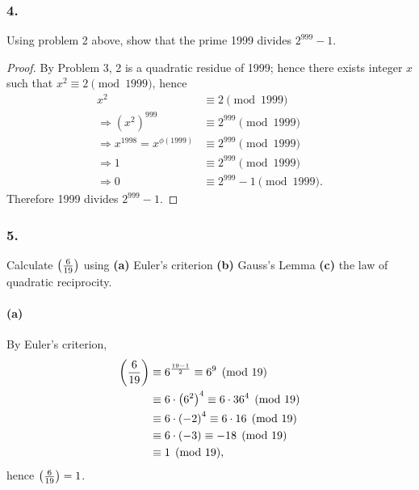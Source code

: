 \subsubsection{4.} Using problem 2 above, show that the prime 1999
divides $2^{999}-1$.

\begin{proof}
    By Problem 3, 2 is a quadratic residue of 1999; hence there exists integer $x$
    such that $x^2 \equiv 2 \pmod{1999}$, hence
    \begin{align*}
        x^2 &\equiv 2 \pmod{1999} \\
        \Rightarrow \left(x^2\right)^{999} &\equiv 2^{999} \pmod{1999} \\
        \Rightarrow x^{1998} = x^{\phi\left(1999\right)} &\equiv 2^{999} \pmod{1999} \\
        \Rightarrow 1 &\equiv 2^{999} \pmod{1999} \\
        \Rightarrow 0 &\equiv 2^{999}-1 \pmod{1999}.
    \end{align*}
    Therefore 1999 divides $2^{999}-1$.
\end{proof}

\subsubsection{5.} Calculate $\left(\frac{6}{19}\right)$ using \textbf{(a)} Euler's
criterion \textbf{(b)} Gauss's Lemma \textbf{(c)} the law of quadratic
reciprocity.

\paragraph{(a)} By Euler's criterion,
\begin{align*}
    \left(\frac{6}{19}\right) & \equiv 6^{\frac{19-1}{2}} \equiv 6^9 \pmod{19} \\
    &\equiv 6 \cdot \left(6^2\right)^4 \equiv 6 \cdot 36^4 \pmod{19} \\
    &\equiv 6 \cdot \left(-2\right)^4 \equiv 6 \cdot 16 \pmod{19} \\
    &\equiv 6 \cdot \left(-3\right) \equiv -18 \pmod{19} \\
    &\equiv 1 \pmod{19},
\end{align*}
hence $\left(\frac{6}{19}\right)=1$.

